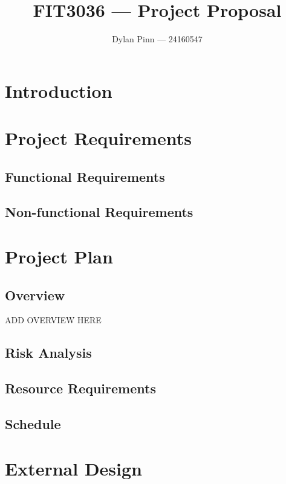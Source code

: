 \documentclass[a4paper,11pt]{article}
\begin{document}
\title{FIT3036 --- Project Proposal}
\author{Dylan Pinn --- 24160547}
\maketitle
\pagebreak

\tableofcontents
\pagebreak

\section{Introduction}

\section{Project Requirements}

  \subsection{Functional Requirements}

  \subsection{Non-functional Requirements}

\section{Project Plan}

  \subsection{Overview}

  ADD OVERVIEW HERE

  \subsection{Risk Analysis}

  \subsection{Resource Requirements}

  \subsection{Schedule}

\section{External Design}
\end{document}
